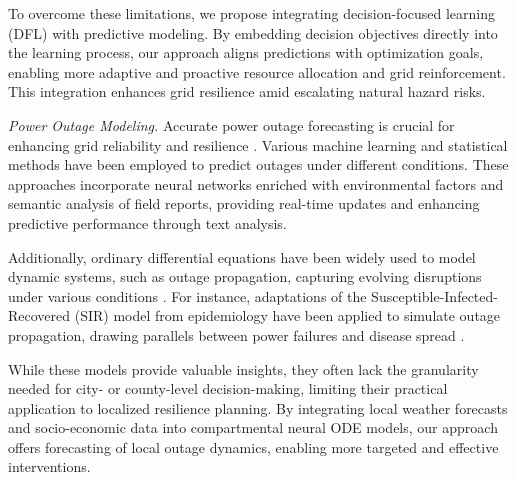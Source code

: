 To overcome these limitations, we propose integrating decision-focused learning (DFL) with predictive modeling. By embedding decision objectives directly into the learning process, our approach aligns predictions with optimization goals, enabling more adaptive and proactive resource allocation and grid reinforcement. This integration enhances grid resilience amid escalating natural hazard risks.

\vspace{.05in}
\noindent\emph{Power Outage Modeling.}
Accurate power outage forecasting is crucial for enhancing grid reliability and resilience \cite{9160513, 7752978}. Various machine learning and statistical methods have been employed to predict outages under different conditions. 
These approaches incorporate neural networks enriched with environmental factors and semantic analysis of field reports, providing real-time updates and enhancing predictive performance through text analysis.

Additionally, ordinary differential equations have been widely used to model dynamic systems, such as outage propagation, capturing evolving disruptions under various conditions \cite{zhang2024recurrent,chen2018neural}. For instance, adaptations of the Susceptible-Infected-Recovered (SIR) model from epidemiology have been applied to simulate outage propagation, drawing parallels between power failures and disease spread \cite{9646114}.

While these models provide valuable insights, they often lack the granularity needed for city- or county-level decision-making, limiting their practical application to localized resilience planning. By integrating local weather forecasts and socio-economic data into compartmental neural ODE models, our approach offers forecasting of local outage dynamics, enabling more targeted and effective interventions.

